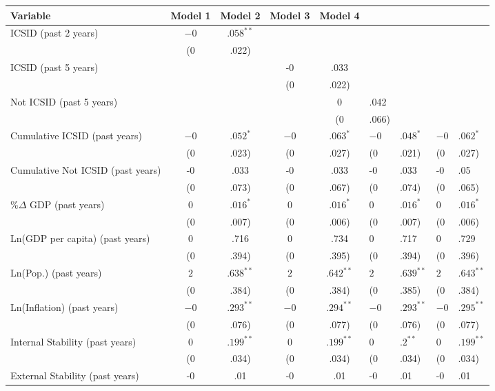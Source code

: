 \begin{table}[ht]
\centering
\begingroup\footnotesize
\begin{tabular}{lcccc}
 Variable & Model 1 & Model 2 & Model 3 & Model 4 \\ 
  \hline
\hline
ICSID (past 2 years) & $-0$&$.058^{\ast\ast}$ &  &  &  \\ 
   & (0&.022) &  &  &  \\ 
  ICSID (past 5 years) &  &  & -0&.033 &  \\ 
   &  &  & (0&.022) &  \\ 
  Not ICSID (past 5 years) &  &  &  & 0&.042 \\ 
   &  &  &  & (0&.066) \\ 
  Cumulative ICSID (past  years) & $-0$&$.052^{\ast}$ & $-0$&$.063^{\ast}$ & $-0$&$.048^{\ast}$ & $-0$&$.062^{\ast}$ \\ 
   & (0&.023) & (0&.027) & (0&.021) & (0&.027) \\ 
  Cumulative Not ICSID (past  years) & -0&.033 & -0&.033 & -0&.033 & -0&.05 \\ 
   & (0&.073) & (0&.067) & (0&.074) & (0&.065) \\ 
  \%$\Delta$ GDP (past  years) & $0$&$.016^{\ast}$ & $0$&$.016^{\ast}$ & $0$&$.016^{\ast}$ & $0$&$.016^{\ast}$ \\ 
   & (0&.007) & (0&.006) & (0&.007) & (0&.006) \\ 
  Ln(GDP per capita) (past  years) & 0&.716 & 0&.734 & 0&.717 & 0&.729 \\ 
   & (0&.394) & (0&.395) & (0&.394) & (0&.396) \\ 
  Ln(Pop.) (past  years) & $2$&$.638^{\ast\ast}$ & $2$&$.642^{\ast\ast}$ & $2$&$.639^{\ast\ast}$ & $2$&$.643^{\ast\ast}$ \\ 
   & (0&.384) & (0&.384) & (0&.385) & (0&.384) \\ 
  Ln(Inflation) (past  years) & $-0$&$.293^{\ast\ast}$ & $-0$&$.294^{\ast\ast}$ & $-0$&$.293^{\ast\ast}$ & $-0$&$.295^{\ast\ast}$ \\ 
   & (0&.076) & (0&.077) & (0&.076) & (0&.077) \\ 
  Internal Stability (past  years) & $0$&$.199^{\ast\ast}$ & $0$&$.199^{\ast\ast}$ & $0$&$.2^{\ast\ast}$ & $0$&$.199^{\ast\ast}$ \\ 
   & (0&.034) & (0&.034) & (0&.034) & (0&.034) \\ 
  External Stability (past  years) & -0&.01 & -0&.01 & -0&.01 & -0&.01 \\ 

\end{tabular}
\end{table}
